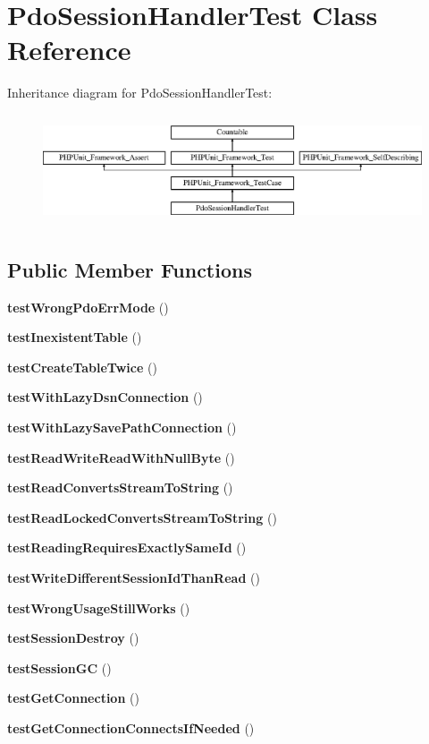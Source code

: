 \section{Pdo\+Session\+Handler\+Test Class Reference}
\label{class_symfony_1_1_component_1_1_http_foundation_1_1_tests_1_1_session_1_1_storage_1_1_handler_1_1_pdo_session_handler_test}
Inheritance diagram for Pdo\+Session\+Handler\+Test\+:\begin{figure}[H]
\begin{center}
\leavevmode
\includegraphics[height=3.303835cm]{class_symfony_1_1_component_1_1_http_foundation_1_1_tests_1_1_session_1_1_storage_1_1_handler_1_1_pdo_session_handler_test}
\end{center}
\end{figure}
\subsection*{Public Member Functions}
\begin{DoxyCompactItemize}
\item 
{\bf test\+Wrong\+Pdo\+Err\+Mode} ()
\item 
{\bf test\+Inexistent\+Table} ()
\item 
{\bf test\+Create\+Table\+Twice} ()
\item 
{\bf test\+With\+Lazy\+Dsn\+Connection} ()
\item 
{\bf test\+With\+Lazy\+Save\+Path\+Connection} ()
\item 
{\bf test\+Read\+Write\+Read\+With\+Null\+Byte} ()
\item 
{\bf test\+Read\+Converts\+Stream\+To\+String} ()
\item 
{\bf test\+Read\+Locked\+Converts\+Stream\+To\+String} ()
\item 
{\bf test\+Reading\+Requires\+Exactly\+Same\+Id} ()
\item 
{\bf test\+Write\+Different\+Session\+Id\+Than\+Read} ()
\item 
{\bf test\+Wrong\+Usage\+Still\+Works} ()
\item 
{\bf test\+Session\+Destroy} ()
\item 
{\bf test\+Session\+G\+C} ()
\item 
{\bf test\+Get\+Connection} ()
\item 
{\bf test\+Get\+Connection\+Connects\+If\+Needed} ()
\end{DoxyCompactItemize}
